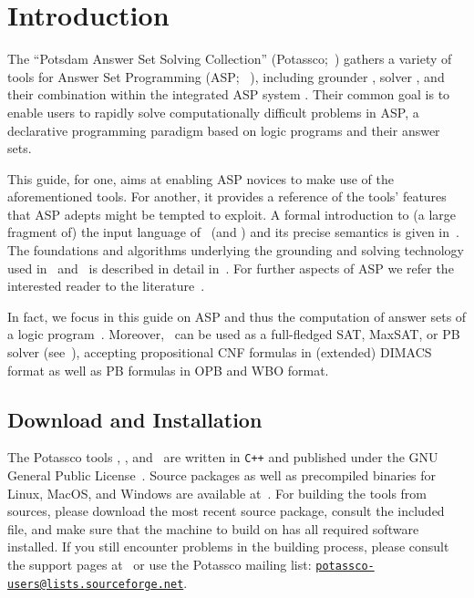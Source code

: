 \section{Introduction}\label{sec:introduction}

The ``Potsdam Answer Set Solving Collection'' (Potassco;~\cite{gekakaosscsc11a,gekakasc12a,potassco})
gathers a variety of tools for Answer Set Programming (ASP;~%
\cite{ankolisc05a,baral02a,breitr11a,gelfond08a,gelkah14a,gelleo02a,lifschitz02a,martru99a,niemela99a}),
including grounder \gringo, solver \clasp, and their combination within the integrated ASP system \clingo.
Their common goal is to enable users
to rapidly solve computationally difficult problems in ASP,
a declarative programming paradigm based on
logic programs and their answer sets.

This guide, for one, aims at enabling ASP novices to make use of the aforementioned tools.
For another, it provides a reference of the tools' features that ASP adepts might be tempted to exploit.
%
A formal introduction to (a large fragment of) the input language of \gringo\ (and \clingo) and its precise semantics is given in~\cite{gehakalisc14a}.
The foundations and algorithms underlying the grounding and solving technology used in \gringo\ and \clasp\ is described in detail in~\cite{gekakasc12a}.
%
For further aspects of ASP we refer the interested reader to the literature~\cite{baral02a,gelkah14a}.

In fact, 
we focus in this guide on ASP and thus the computation of answer sets of a logic program~\cite{gellif88b}.
Moreover, \clasp\ can be used as a full-fledged SAT, MaxSAT, or PB solver (see~\cite{SATHandbook}), 
accepting propositional CNF formulas in (extended) DIMACS format as well as PB formulas in OPB and WBO format.

\subsection{Download and Installation}\label{sec:install}

The Potassco tools \gringo, \clasp, and \clingo\
are written in \texttt{C++} and published under the GNU General Public License~\cite{GNUgpl}.
Source packages as well as precompiled binaries for Linux, MacOS, and Windows
are available at~\cite{potassco}.
For building the tools from sources,
please download the most recent source package, consult the
included  %
file,
and make sure that the machine to build on has all
required software installed.
If you still encounter problems in the building process,
please 
consult the support pages at~\cite{potassco}
or use the Potassco mailing list:
\href{mailto:potassco-users@lists.sourceforge.net}{\texttt{potassco-users@lists.sourceforge.net}}.

